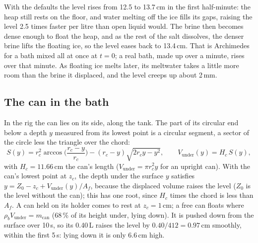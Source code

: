 \documentclass[11pt,a4paper]{article}
\begin{document}
With the defaults the level rises from 12.5 to 13.7\,cm in the first half-minute: the heap still rests
on the floor, and water melting off the ice fills its gaps, raising the level 2.5 times faster per litre
than open liquid would. The brine then becomes dense enough to float the heap, and as the rest of the
salt dissolves, the denser brine lifts the floating ice, so the level eases back to 13.4\,cm. That is
Archimedes for a bath mixed all at once at $t = 0$; a real bath, made up over a minute, rises over that
minute. As floating ice melts later, its meltwater takes a little more room than the brine it
displaced, and the level creeps up about 2\,mm.

\subsection{The can in the bath}
\label{sec:canlevel}
In the rig the can lies on its side, along the tank. The part of its circular end below a depth $y$
measured from its lowest point is a circular segment, a sector of the circle less the triangle over the
chord:
\begin{equation}
S(y) = r_c^2\arccos\!\Big(\frac{r_c - y}{r_c}\Big) - (r_c - y)\sqrt{2r_c y - y^2},
\qquad V_{\text{under}}(y) = H_c\,S(y),
\label{eq:segment}
\end{equation}
with $H_c = 11.66$\,cm the can's length ($V_{\text{under}} = \pi r_c^2 y$ for an upright can). With the
can's lowest point at $z_c$, the depth under the surface $y$ satisfies $y = Z_0 - z_c + V_{\text{under}}(y)/A_f$,
because the displaced volume raises the level ($Z_0$ is the level without the can); this has one root,
since $H_c$ times the chord is less than $A_f$. A can held on its holder comes to rest at $z_c = 1$\,cm;
a free can floats where $\rho_b V_{\text{under}} = m_{\text{can}}$ (68\,\% of its height under, lying
down). It is pushed down from the surface over 10\,s, so its 0.40\,L raises the level by
$0.40/412 = 0.97$\,cm smoothly, within the first 5\,s: lying down it is only 6.6\,cm high.
\end{document}
